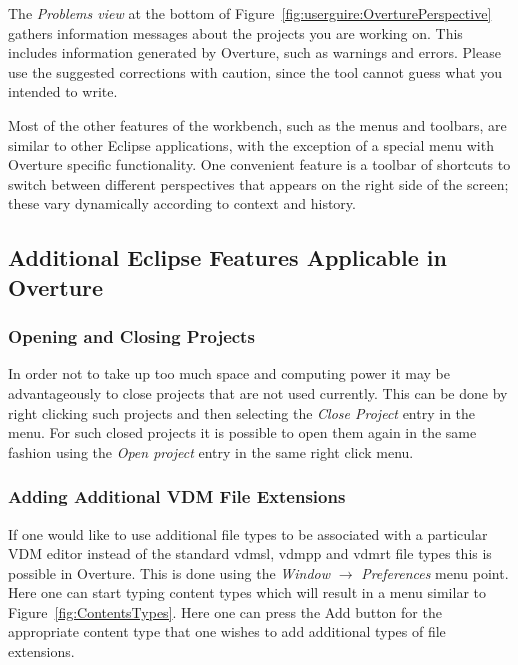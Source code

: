 \documentclass{overturerepsec}
\begin{document}
The \emph{Problems view} at the bottom of 
Figure~\ref{fig:userguire:OverturePerspective} gathers 
information messages about the projects you are
working on. This includes information generated by Overture, such as
warnings and errors. Please use the suggested corrections with caution,
since the tool cannot guess what you intended to write.

Most of the other features of the workbench, such as the menus and
toolbars, are similar to other Eclipse applications, with the exception 
of a special menu with Overture specific functionality. One
convenient feature is a toolbar of shortcuts to switch between
different perspectives that appears on the right side of the screen;
these vary dynamically according to context and history.

\subsection{Additional Eclipse Features Applicable in Overture}

\subsubsection{Opening and Closing Projects}

In order not to take up too much space and computing power it may be
advantageously to close projects that are not used currently. This can
be done by right clicking such projects and then selecting the
\emph{Close Project} entry in the menu.
For such closed projects it is possible
to open them again in the same fashion using the \emph{Open project}
entry in the same right click
menu. 
 

\subsubsection{Adding Additional VDM File Extensions}

If one would like to use additional file types to be associated with a
particular VDM editor instead of the standard {\ttfamily vdmsl},
{\ttfamily vdmpp} and {\ttfamily vdmrt} file types this is possible in
Overture. This is done using the \emph{Window} $\rightarrow$
\emph{Preferences} menu point. Here one can start typing {\ttfamily
  content types} which will result in a menu similar to
Figure~\ref{fig:ContentsTypes}. Here one can press the {\ttfamily Add}
button for the appropriate content type that one wishes to add
additional types of file extensions.
\end{document}
